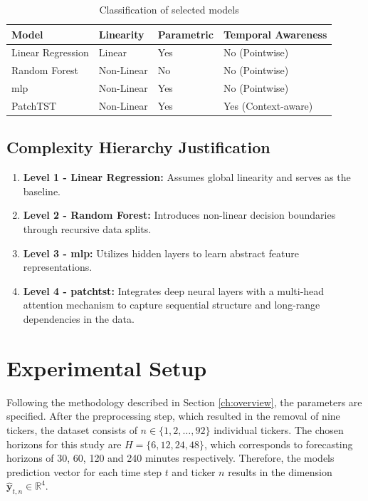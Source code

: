 \documentclass[12pt,twoside=false,a4paper,parskip]{scrbook}
\begin{document}
\begin{table}[htbp]
\centering
\caption{Classification of selected models}
\label{tab:ModelCategorizationMatrix}
\begin{tabular}{llll}
\toprule
\textbf{Model} & \textbf{Linearity} & \textbf{Parametric} & \textbf{Temporal Awareness} \\ 
\midrule
Linear Regression             & Linear             & Yes                 & No (Pointwise)             \\
Random Forest                 & Non-Linear         & No                  & No (Pointwise)             \\
\gls{mlp}                     & Non-Linear         & Yes                 & No (Pointwise)             \\
PatchTST                      & Non-Linear         & Yes                 & Yes (Context-aware)        \\ 
\bottomrule
\end{tabular}
\end{table}

\subsection{Complexity Hierarchy Justification}

\begin{enumerate}
\item \textbf{Level 1 - Linear Regression:} Assumes global linearity and serves as the baseline.
\item \textbf{Level 2 - Random Forest:} Introduces non-linear decision boundaries through recursive data splits.
\item \textbf{Level 3 - \gls{mlp}:} Utilizes hidden layers to learn abstract feature representations.
\item \textbf{Level 4 - \gls{patchtst}:} Integrates deep neural layers with a multi-head attention mechanism to capture sequential structure and long-range dependencies in the data.
\end{enumerate}

\section{Experimental Setup}
Following the methodology described in Section \ref{ch:overview}, the parameters are specified. After the preprocessing step, which resulted in the removal of nine tickers, the dataset consists of $n \in \{1, 2, \dots, 92\}$ individual tickers. The chosen horizons for this study are $H = \{6, 12, 24, 48\}$, which corresponds to forecasting horizons of 30, 60, 120 and 240 minutes respectively. Therefore, the models prediction vector for each time step $t$ and ticker $n$ results in the dimension $\hat{\mathbf{y}}_{t, n} \in \mathbb{R}^4$.
\end{document}
